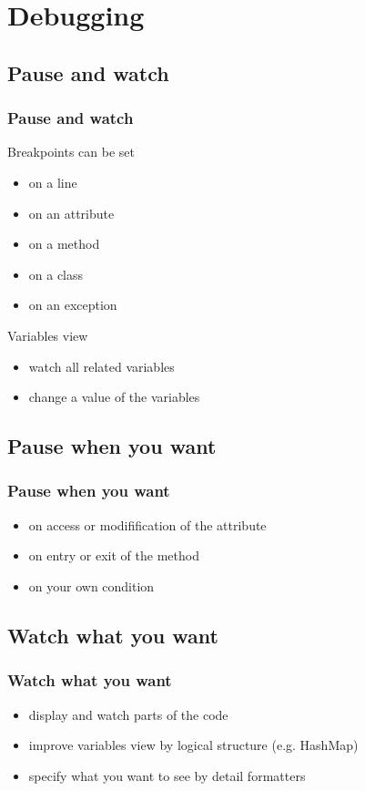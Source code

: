 \documentclass{beamer}
\begin{document}
\section{Debugging}

\subsection{Pause and watch}
\begin{frame}[fragile]
\frametitle{Pause and watch}
Breakpoints can be set
\begin{itemize}
\item on a line
\item on an attribute
\item on a method
\item on a class
\item on an exception
\end{itemize}
Variables view
\begin{itemize}
\item watch all related variables
\item change a value of the variables
\end{itemize}
\end{frame}

\subsection{Pause when you want}
\begin{frame}[fragile]
\frametitle{Pause when you want}
\begin{itemize}
\item on access or modifification of the attribute
\item on entry or exit of the method
\item on your own condition
\end{itemize}
\end{frame}

\subsection{Watch what you want}
\begin{frame}[fragile]
\frametitle{Watch what you want}
\begin{itemize}
\item display and watch parts of the code
\item improve variables view by logical structure (e.g. HashMap)
\item specify what you want to see by detail formatters
\end{itemize}  
\end{frame}
\end{document}
